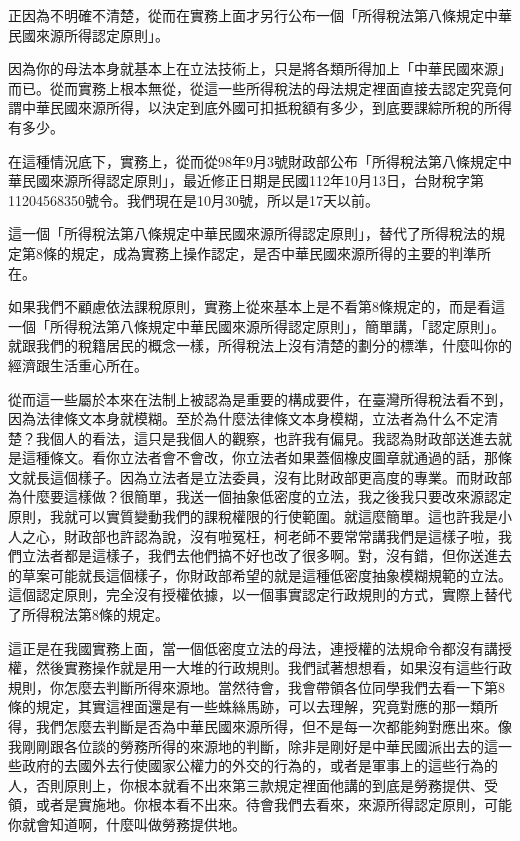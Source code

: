 \documentclass[oneside,sub3section]{ctexbook}
\begin{document}
正因為不明確不清楚，從而在實務上面才另行公布一個「所得稅法第八條規定中華民國來源所得認定原則」。

因為你的母法本身就基本上在立法技術上，只是將各類所得加上「中華民國來源」而已。從而實務上根本無從，從這一些所得稅法的母法規定裡面直接去認定究竟何謂中華民國來源所得，以決定到底外國可扣抵稅額有多少，到底要課綜所稅的所得有多少。

在這種情況底下，實務上，從而從98年9月3號財政部公布「所得稅法第八條規定中華民國來源所得認定原則」，最近修正日期是民國112年10月13日，台財稅字第11204568350號令。我們現在是10月30號，所以是17天以前。

這一個「所得稅法第八條規定中華民國來源所得認定原則」，替代了所得稅法的規定第8條的規定，成為實務上操作認定，是否中華民國來源所得的主要的判準所在。

如果我們不顧慮依法課稅原則，實務上從來基本上是不看第8條規定的，而是看這一個「所得稅法第八條規定中華民國來源所得認定原則」，簡單講，「認定原則」。就跟我們的稅籍居民的概念一樣，所得稅法上沒有清楚的劃分的標準，什麼叫你的經濟跟生活重心所在。

從而這一些屬於本來在法制上被認為是重要的構成要件，在臺灣所得稅法看不到，因為法律條文本身就模糊。至於為什麼法律條文本身模糊，立法者為什么不定清楚？我個人的看法，這只是我個人的觀察，也許我有偏見。我認為財政部送進去就是這種條文。看你立法者會不會改，你立法者如果蓋個橡皮圖章就通過的話，那條文就長這個樣子。因為立法者是立法委員，沒有比財政部更高度的專業。而財政部為什麼要這樣做？很簡單，我送一個抽象低密度的立法，我之後我只要改來源認定原則，我就可以實質變動我們的課稅權限的行使範圍。就這麼簡單。這也許我是小人之心，財政部也許認為說，沒有啦冤枉，柯老師不要常常講我們是這樣子啦，我們立法者都是這樣子，我們去他們搞不好也改了很多啊。對，沒有錯，但你送進去的草案可能就長這個樣子，你財政部希望的就是這種低密度抽象模糊規範的立法。這個認定原則，完全沒有授權依據，以一個事實認定行政規則的方式，實際上替代了所得稅法第8條的規定。

這正是在我國實務上面，當一個低密度立法的母法，連授權的法規命令都沒有講授權，然後實務操作就是用一大堆的行政規則。我們試著想想看，如果沒有這些行政規則，你怎麼去判斷所得來源地。當然待會，我會帶領各位同學我們去看一下第8條的規定，其實這裡面還是有一些蛛絲馬跡，可以去理解，究竟對應的那一類所得，我們怎麼去判斷是否為中華民國來源所得，但不是每一次都能夠對應出來。像我剛剛跟各位談的勞務所得的來源地的判斷，除非是剛好是中華民國派出去的這一些政府的去國外去行使國家公權力的外交的行為的，或者是軍事上的這些行為的人，否則原則上，你根本就看不出來第三款規定裡面他講的到底是勞務提供、受領，或者是實施地。你根本看不出來。待會我們去看來，來源所得認定原則，可能你就會知道啊，什麼叫做勞務提供地。
\end{document}
